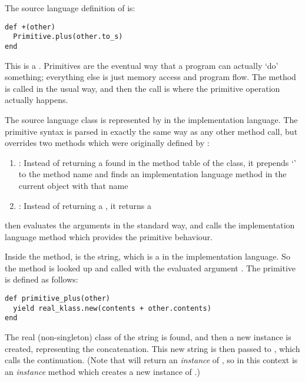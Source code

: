 The source language definition of  is:

\begin{lstlisting}
def +(other)
  Primitive.plus(other.to_s)
end
\end{lstlisting}

This is a . Primitives are the eventual way that a program can actually `do' something; everything else is just memory access and program flow. The \code{+} method is called in the usual way, and then the  call is where the primitive operation actually happens.

The source language  class is represented by  in the implementation language. The primitive syntax is parsed in exactly the same way as any other method call, but \- overrides two methods which were originally defined by :

\begin{enumerate}
  \item \textbf{}: Instead of returning a  found in the method table of the class, it prepends `' to the method name and finds an implementation language method in the current  object with that name
  
  \item \textbf{}: Instead of returning a , it returns a 
\end{enumerate}

 then evaluates the arguments in the standard way, and calls the implementation language method which provides the primitive behaviour.

Inside the \code{+} method,  is the  string, which is a  in the implementation language. So the  method is looked up and called with the evaluated argument . The primitive is defined as follows:

\begin{minipage}{\textwidth}
\begin{lstlisting}
def primitive_plus(other)
  yield real_klass.new(contents + other.contents)
end
\end{lstlisting}
\end{minipage}

The real (non-singleton) class of the string is found, and then a new instance is created, representing the concatenation. This new string is then passed to , which calls the continuation. (Note that  will return an \textit{instance} of , so in this context  is an \textit{instance} method which creates a new instance of .)

